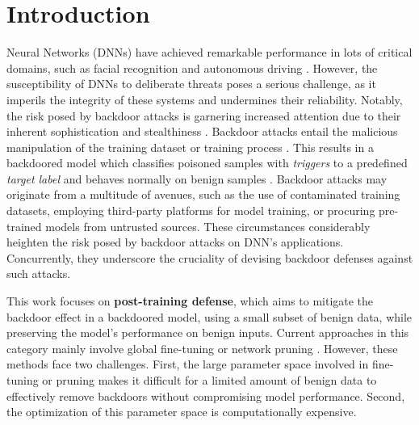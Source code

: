 
\section{Introduction\label{sec1}}

 Neural Networks (DNNs) have achieved remarkable performance in lots of critical domains, such as facial recognition \cite{sharif2016accessorize} and autonomous driving \cite{yurtsever2020survey}.
However, the susceptibility of DNNs to deliberate threats \cite{dong2021query,goldblum2022dataset,yin2023generalizable,wu2023adversarial} poses a serious challenge, as it imperils the integrity of these systems and undermines their reliability. Notably, the risk posed by backdoor attacks is garnering increased attention due to their inherent sophistication and stealthiness \cite{wu2024backdoorbench,zhu2024breaking}.
Backdoor attacks entail the malicious manipulation of the training dataset \cite{gu2019badnets} or training process \cite{liang2024badclip}. This results in a backdoored model which classifies poisoned samples with \textit{triggers} to a predefined \textit{target label} and behaves normally on benign samples \cite{gu2019badnets}. Backdoor attacks may originate from a multitude of avenues, such as the use of contaminated training datasets, employing third-party platforms for model training, or procuring pre-trained models from untrusted sources. These circumstances considerably heighten the risk posed by backdoor attacks on DNN's applications. Concurrently, they underscore the cruciality of devising backdoor defenses against such attacks.


This work focuses on \textbf{post-training defense}, which aims to mitigate the backdoor effect in a backdoored model, using a small subset of benign data, while preserving the model's performance on benign inputs.
Current approaches in this category mainly involve global fine-tuning \cite{zeng2022adversarial,zhu2023enhancing} or network pruning \cite{liu2018fine,zheng2022pre}. However, these methods face two challenges. First, the large parameter space involved in fine-tuning or pruning makes it difficult for a limited amount of benign data to effectively remove backdoors without compromising model performance. Second, the optimization of this parameter space is computationally expensive.

